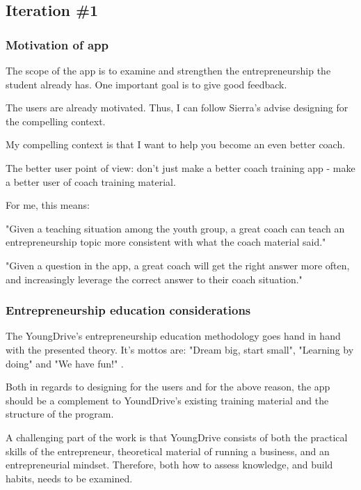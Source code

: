 \subsection{Iteration \#1}

\subsubsection{Motivation of app}
The scope of the app is to examine and strengthen the entrepreneurship the student already has. One important goal is to give good feedback.

The users are already motivated. Thus, I can follow Sierra's advise designing for the compelling context.

My compelling context is that I want to help you become an even better coach.

The better user point of view: don’t just make a better coach training app - make a better user of coach training material.

For me, this means:

"Given a teaching situation among the youth group, a great coach can teach an entrepreneurship topic more consistent with what the coach material said."

"Given a question in the app, a great coach will get the right answer more often, and increasingly leverage the correct answer to their coach situation."

\subsubsection{Entrepreneurship education considerations}
The YoungDrive's entrepreneurship education methodology goes hand in hand with the presented theory. It's mottos are: "Dream big, start small", "Learning by doing" and "We have fun!" \cite{youngdrive}.

Both in regards to designing for the users and for the above reason, the app should be a complement to YoundDrive's existing training material and the structure of the program.

A challenging part of the work is that YoungDrive consists of both the practical skills of the entrepreneur, theoretical material of running a business, and an entrepreneurial mindset. Therefore, both how to assess knowledge, and build habits, needs to be examined.
